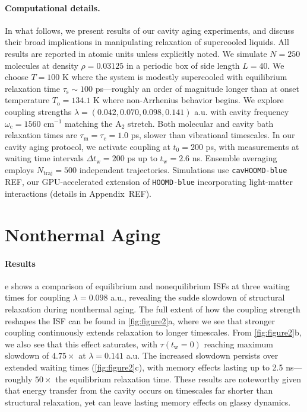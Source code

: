 \documentclass[%
 reprint,
 amsmath,amssymb,
 aps,
]{revtex4-2}
\begin{document}
\paragraph*{Computational details.} 
In what follows, we present results of our cavity aging experiments, and discuss their broad implications in manipulating relaxation of supercooled liquids. All results are reported in atomic units unless explicitly noted. 
We simulate $N = 250$ molecules at density $\rho = 0.03125$ in a periodic box of side length $L = 40$. 
We choose $T=100$ K where the system is modestly supercooled with equilibrium relaxation time $\tau_\mathrm{s} \sim 100$ ps---roughly an order of magnitude longer than at onset temperature $T_\mathrm{o} = 134.1$ K where non-Arrhenius behavior begins.
We explore coupling strengths $\lambda = (0.042, 0.070,0.098, 0.141)$ a.u. with cavity frequency $\omega_\mathrm{c} = 1560$ cm$^{-1}$ matching the $\mathrm{A}_2$ stretch.
Both molecular and cavity bath relaxation times are $\tau_\mathrm{m} = \tau_\mathrm{c} = 1.0$ ps, slower than vibrational timescales.
In our cavity aging protocol, we activate coupling at $t_0 = 200$ ps, with measurements at waiting time intervals $\Delta t_\mathrm{w} =200$ ps up to $t_\mathrm{w} = 2.6$ ns.
Ensemble averaging employs $N_\mathrm{traj} = 500$ independent trajectories.
Simulations use \texttt{cavHOOMD-blue} REF, our GPU-accelerated extension of \texttt{HOOMD-blue} incorporating light-matter interactions (details in Appendix~REF).

\section*{Nonthermal Aging}

\paragraph*{Results} e shows a comparison of equilibrium and nonequilibrium ISFs at three waiting times for coupling $\lambda = 0.098$ a.u., revealing the sudde slowdown of structural relaxation during nonthermal aging. 
The full extent of how the coupling strength reshapes the ISF can be found in \cref{fig:figure2}a, where we see that stronger coupling continuously extends relaxation to longer timescales. 
From \cref{fig:figure2}b, we also see that this effect saturates, with $\tau(t_\mathrm{w}=0)$ reaching maximum slowdown of $4.75\times$ at $\lambda = 0.141$ a.u.
The increased slowdown persists over extended waiting times (\cref{fig:figure2}c), with memory effects lasting up to 2.5 ns—roughly $50\times$ the equilibrium relaxation time.
These results are noteworthy given that energy transfer from the cavity occurs on timescales far shorter than structural relaxation, yet can leave lasting memory effects on glassy dynamics.
\end{document}
